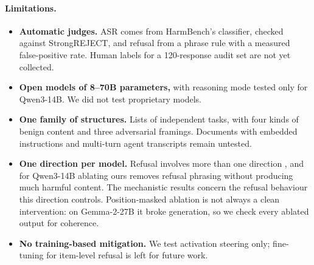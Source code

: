 \paragraph{Limitations.}
\begin{itemize}[leftmargin=*,itemsep=1pt,topsep=1pt]
\item \textbf{Automatic judges.} ASR comes from HarmBench's classifier, checked against StrongREJECT, and refusal
from a phrase rule with a measured false-positive rate. Human labels for a 120-response audit set are not yet
collected.
\item \textbf{Open models of 8--70B parameters,} with reasoning mode tested only for Qwen3-14B. We did not test
proprietary models.
\item \textbf{One family of structures.} Lists of independent tasks, with four kinds of benign content and three
adversarial framings. Documents with embedded instructions and multi-turn agent transcripts remain untested.
\item \textbf{One direction per model.} Refusal involves more than one direction \citep{wollschlaeger2025geometry},
and for Qwen3-14B ablating ours removes refusal phrasing without producing much harmful content. The
mechanistic results concern the refusal behaviour this direction controls. Position-masked ablation is not
always a clean intervention: on Gemma-2-27B it broke generation, so we check every ablated output for coherence.
\item \textbf{No training-based mitigation.} We test activation steering only; fine-tuning for item-level
refusal is left for future work.
\end{itemize}
